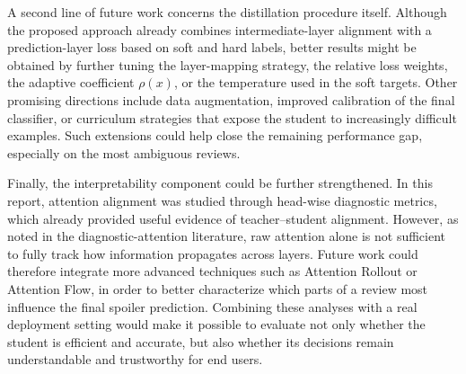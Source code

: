 \documentclass[11pt, a4paper]{article}
\begin{document}
A second line of future work concerns the distillation procedure itself. Although the proposed approach already combines intermediate-layer alignment with a prediction-layer loss based on soft and hard labels, better results might be obtained by further tuning the layer-mapping strategy, the relative loss weights, the adaptive coefficient $\rho(x)$, or the temperature used in the soft targets. Other promising directions include data augmentation, improved calibration of the final classifier, or curriculum strategies that expose the student to increasingly difficult examples. Such extensions could help close the remaining performance gap, especially on the most ambiguous reviews. 

Finally, the interpretability component could be further strengthened. In this report, attention alignment was studied through head-wise diagnostic metrics, which already provided useful evidence of teacher--student alignment. However, as noted in the diagnostic-attention literature, raw attention alone is not sufficient to fully track how information propagates across layers. Future work could therefore integrate more advanced techniques such as Attention Rollout or Attention Flow, in order to better characterize which parts of a review most influence the final spoiler prediction. Combining these analyses with a real deployment setting would make it possible to evaluate not only whether the student is efficient and accurate, but also whether its decisions remain understandable and trustworthy for end users. 


\end{document}
